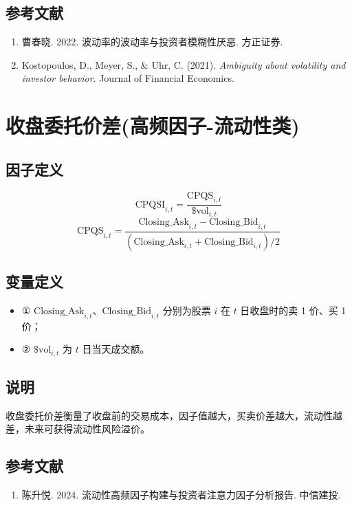 \documentclass{article}
\begin{document}
\subsection{参考文献}
\begin{enumerate}
    \item 曹春晓. 2022. 波动率的波动率与投资者模糊性厌恶. 方正证券.
    \item Kostopoulos, D., Meyer, S., \& Uhr, C. (2021). \textit{Ambiguity about volatility and investor behavior}. Journal of Financial Economics.
\end{enumerate}

\section{收盘委托价差(高频因子-流动性类)}

\subsection{因子定义}
\begin{equation}
    \mathrm{CPQSI}_{i,t} = \frac{\mathrm{CPQS}_{i,t}}{\$ \mathrm{vol}_{i,t}}
\end{equation}
\begin{equation}
    \mathrm{CPQS}_{i,t} = \frac{\mathrm{Closing\_Ask}_{i,t} - \mathrm{Closing\_Bid}_{i,t}}{(\mathrm{Closing\_Ask}_{i,t} + \mathrm{Closing\_Bid}_{i,t})/2}
\end{equation}

\subsection{变量定义}
\begin{itemize}
    \item ① \( \mathrm{Closing\_Ask}_{i,t} \)、\( \mathrm{Closing\_Bid}_{i,t} \) 分别为股票 \( i \) 在 \( t \) 日收盘时的卖 1 价、买 1 价；
    \item ② \( \$ \mathrm{vol}_{i,t} \) 为 \( t \) 日当天成交额。
\end{itemize}

\subsection{说明}
收盘委托价差衡量了收盘前的交易成本，因子值越大，买卖价差越大，流动性越差，未来可获得流动性风险溢价。

\subsection{参考文献}
\begin{enumerate}
    \item 陈升悦. 2024. 流动性高频因子构建与投资者注意力因子分析报告. 中信建投.
\end{enumerate}
\end{document}
